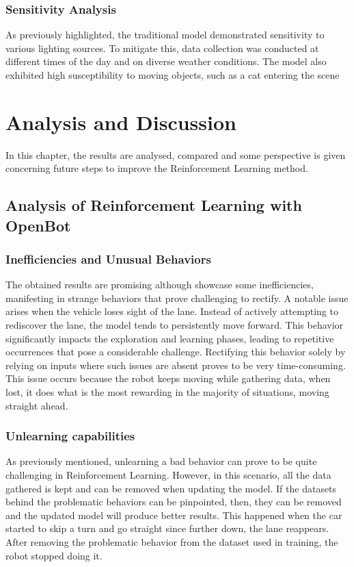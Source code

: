 \documentclass[12pt]{report}
\begin{document}
\subsection{Sensitivity Analysis}

As previously highlighted, the traditional model demonstrated sensitivity to various lighting sources. To mitigate this, data collection was conducted at different times of the day and on diverse weather conditions. The model also exhibited high susceptibility to moving objects, such as a cat entering the scene

\chapter{Analysis and Discussion}
\label{sub:Analysis_and_discussion}
In this chapter, the results are analysed, compared and some perspective is given concerning future steps to improve the Reinforcement Learning method.

\section{Analysis of Reinforcement Learning with OpenBot}
\label{sub:analysis_rl}
\subsection{Inefficiencies and Unusual Behaviors}
The obtained results are promising although showcase some inefficiencies, manifesting in strange behaviors that prove challenging to rectify. A notable issue arises when the vehicle loses sight of the lane. Instead of actively attempting to rediscover the lane, the model tends to persistently move forward. This behavior significantly impacts the exploration and learning phases, leading to repetitive occurrences that pose a considerable challenge. Rectifying this behavior solely by relying on inputs where such issues are absent proves to be very time-consuming. This issue occurs because the robot  keeps moving while gathering data, when lost, it does what is the most rewarding in the majority of situations, moving straight ahead.

\subsection{Unlearning capabilities}

As previously mentioned, unlearning a bad behavior can prove to be quite challenging in Reinforcement Learning. However, in this scenario, all the data gathered is kept and can be removed when updating the model. If the datasets behind the problematic behaviors can be pinpointed, then, they can be removed and the updated model will produce better results. This happened when the car started to skip a turn and go straight since further down, the lane reappears. After removing the problematic behavior from the dataset used in training, the robot stopped doing it.
\end{document}

